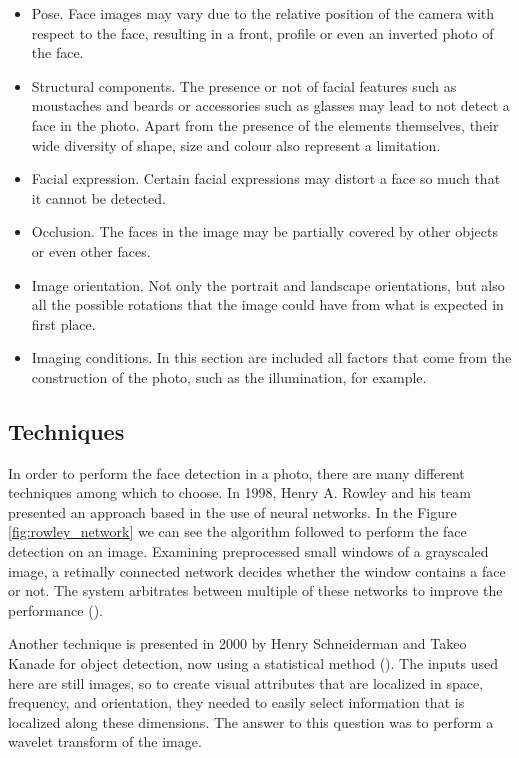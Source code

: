 	\begin{itemize}
		\item Pose. Face images may vary due to the relative position of the camera with respect to the face, resulting in a front, profile or even an inverted photo of the face.  
		\item Structural components. The presence or not of facial features such as moustaches and beards or accessories such as glasses may lead to not detect a face in the photo. Apart from the presence of the elements themselves, their wide diversity of shape, size and colour also represent a limitation.  
		\item Facial expression. Certain facial expressions may distort a face so much that it cannot be detected.    
		\item Occlusion. The faces in the image may be partially covered by other objects or even other faces.
		\item Image orientation. Not only the portrait and landscape orientations, but also all the possible rotations that the image could have from what is expected in first place.
		\item Imaging conditions. In this section are included all factors that come from the construction of the photo, such as the illumination, for example.  
	\end{itemize}

	\subsection{Techniques}
	\label{subsec:face_detec_techniques}
	In order to perform the face detection in a photo, there are many different techniques among which to choose. In 1998, Henry A. Rowley and his team presented an approach based in the use of neural networks. In the Figure \ref{fig:rowley_network} we can see the algorithm followed to perform the face detection on an image. Examining preprocessed small windows of a grayscaled image, a retinally connected network decides whether the window contains a face or not. The system arbitrates between multiple of these networks to improve the performance (\cite{rowley1998neural}). 

	Another technique is presented in 2000 by Henry Schneiderman and Takeo Kanade for object detection, now using a statistical method (\cite{schneiderman2000statistical}). The inputs used here are still images, so to create visual attributes that are localized in space, frequency, and orientation, they needed to easily select information that is localized along these dimensions. The answer to this question was to perform a wavelet transform of the image. 
	
